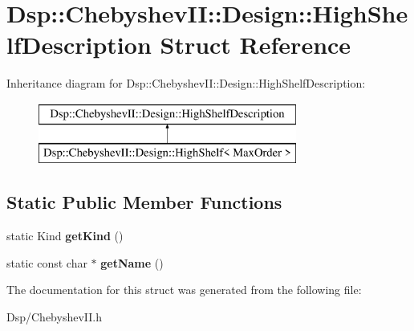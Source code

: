 \hypertarget{structDsp_1_1ChebyshevII_1_1Design_1_1HighShelfDescription}{\section{Dsp\-:\-:Chebyshev\-I\-I\-:\-:Design\-:\-:High\-Shelf\-Description Struct Reference}
\label{structDsp_1_1ChebyshevII_1_1Design_1_1HighShelfDescription}
}
Inheritance diagram for Dsp\-:\-:Chebyshev\-I\-I\-:\-:Design\-:\-:High\-Shelf\-Description\-:\begin{figure}[H]
\begin{center}
\leavevmode
\includegraphics[height=2.000000cm]{structDsp_1_1ChebyshevII_1_1Design_1_1HighShelfDescription}
\end{center}
\end{figure}
\subsection*{Static Public Member Functions}
\begin{DoxyCompactItemize}
\item 
\hypertarget{structDsp_1_1ChebyshevII_1_1Design_1_1HighShelfDescription_a7f8f7541070d1396832a13a4fe43aefb}{static Kind {\bfseries get\-Kind} ()}\label{structDsp_1_1ChebyshevII_1_1Design_1_1HighShelfDescription_a7f8f7541070d1396832a13a4fe43aefb}

\item 
\hypertarget{structDsp_1_1ChebyshevII_1_1Design_1_1HighShelfDescription_ad036bb9f091a999360aa914d1532fd1b}{static const char $\ast$ {\bfseries get\-Name} ()}\label{structDsp_1_1ChebyshevII_1_1Design_1_1HighShelfDescription_ad036bb9f091a999360aa914d1532fd1b}

\end{DoxyCompactItemize}


The documentation for this struct was generated from the following file\-:\begin{DoxyCompactItemize}
\item 
Dsp/Chebyshev\-I\-I.\-h\end{DoxyCompactItemize}
